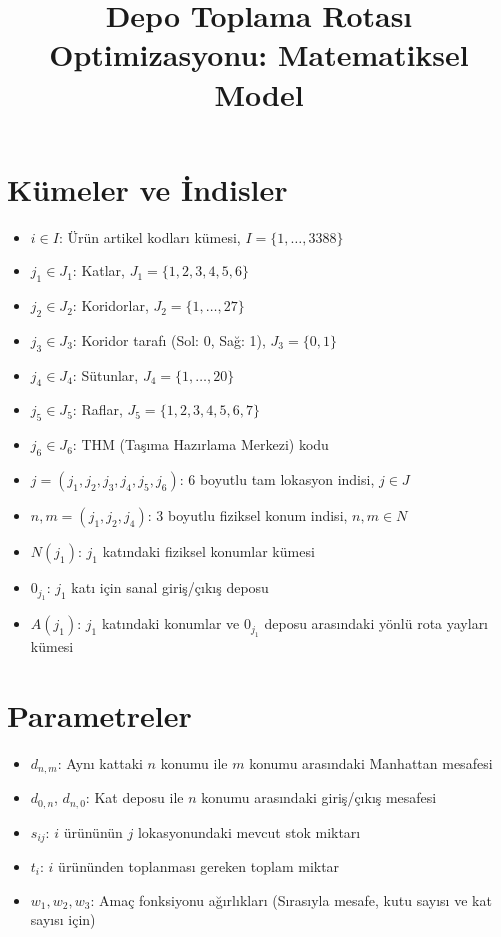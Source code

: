 \documentclass[11pt, a4paper]{article}
\begin{document}
\title{Depo Toplama Rotası Optimizasyonu: Matematiksel Model}
\author{}
\date{}
\maketitle

\section{Kümeler ve İndisler}

\begin{itemize}
    \item $i \in I$: Ürün artikel kodları kümesi, $I = \{1, \dots, 3388\}$
    \item $j_1 \in J_1$: Katlar, $J_1 = \{1, 2, 3, 4, 5, 6\}$
    \item $j_2 \in J_2$: Koridorlar, $J_2 = \{1, \dots, 27\}$
    \item $j_3 \in J_3$: Koridor tarafı (Sol: 0, Sağ: 1), $J_3 = \{0, 1\}$
    \item $j_4 \in J_4$: Sütunlar, $J_4 = \{1, \dots, 20\}$
    \item $j_5 \in J_5$: Raflar, $J_5 = \{1, 2, 3, 4, 5, 6, 7\}$
    \item $j_6 \in J_6$: THM (Taşıma Hazırlama Merkezi) kodu
    \item $j = (j_1, j_2, j_3, j_4, j_5, j_6)$: 6 boyutlu tam lokasyon indisi, $j \in J$
    \item $n, m = (j_1, j_2, j_4)$: 3 boyutlu fiziksel konum indisi, $n, m \in N$
    \item $N(j_1)$: $j_1$ katındaki fiziksel konumlar kümesi
    \item $0_{j_1}$: $j_1$ katı için sanal giriş/çıkış deposu
    \item $A(j_1)$: $j_1$ katındaki konumlar ve $0_{j_1}$ deposu arasındaki yönlü rota yayları kümesi
\end{itemize}

\section{Parametreler}

\begin{itemize}
    \item $d_{n,m}$: Aynı kattaki $n$ konumu ile $m$ konumu arasındaki Manhattan mesafesi
    \item $d_{0,n}$, $d_{n,0}$: Kat deposu ile $n$ konumu arasındaki giriş/çıkış mesafesi
    \item $s_{ij}$: $i$ ürününün $j$ lokasyonundaki mevcut stok miktarı
    \item $t_i$: $i$ ürününden toplanması gereken toplam miktar
    \item $w_1, w_2, w_3$: Amaç fonksiyonu ağırlıkları (Sırasıyla mesafe, kutu sayısı ve kat sayısı için)
\end{itemize}
\end{document}
